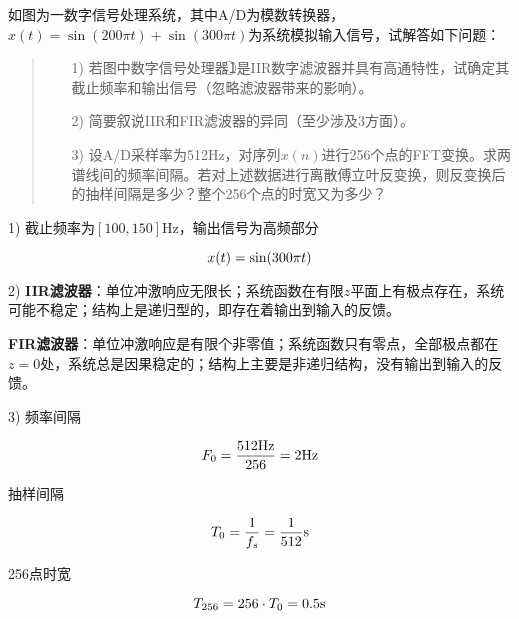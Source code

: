 \documentclass[cn, hazy, blue, normal, 12pt]{elegantnote}
\begin{document}
\begin{exercise}

如图为一数字信号处理系统，其中A/D为模数转换器，$x(t)=\sin(200\pi t)+\sin(300\pi t)$为系统模拟输入信号，试解答如下问题：

\begin{center}
\end{center}

\begin{quote}
\begin{itemize}
    \item[1)] 若图中数字信号处理器\textcircled{1}是IIR数字滤波器并具有高通特性，试确定其截止频率和输出信号（忽略滤波器带来的影响）。
    \item[2)] 简要叙说IIR和FIR滤波器的异同（至少涉及3方面）。
    \item[3)] 设A/D采样率为512Hz，对序列$x(n)$进行256个点的FFT变换。求两谱线间的频率间隔。若对上述数据进行离散傅立叶反变换，则反变换后的抽样间隔是多少？整个256个点的时宽又为多少？
\end{itemize}
\end{quote}

\end{exercise}

\begin{solution}[print=true]

1) 截止频率为$[100, 150]$Hz，输出信号为高频部分

\begin{equation}
\notag
    x(t)=\sin(300\pi t)
\end{equation}

2) \textbf{IIR滤波器}：单位冲激响应无限长；系统函数在有限$z$平面上有极点存在，系统可能不稳定；结构上是递归型的，即存在着输出到输入的反馈。

\textbf{FIR滤波器}：单位冲激响应是有限个非零值；系统函数只有零点，全部极点都在$z=0$处，系统总是因果稳定的；结构上主要是非递归结构，没有输出到输入的反馈。

3) 频率间隔

\begin{equation}
\notag
    F_0=\frac{512\text{Hz}}{256}=2\text{Hz}
\end{equation}

抽样间隔

\begin{equation}
\notag
    T_0=\frac{1}{f_s}=\frac{1}{512}\text{s}
\end{equation}

256点时宽

\begin{equation}
\notag
    T_{256}=256\cdot T_0=0.5\text{s}
\end{equation}

\end{solution}
\end{document}
